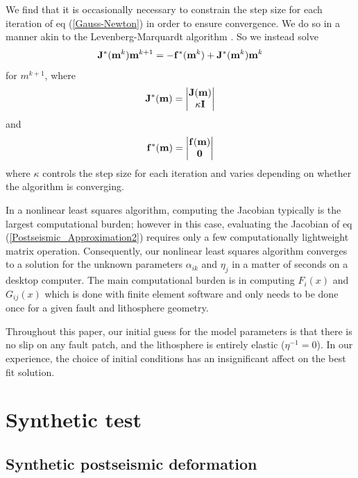 \documentclass[12pt]{article}
\begin{document}
We find that it is occasionally necessary to constrain the step size
for each iteration of eq (\ref{Gauss-Newton}) in order to ensure
convergence.  We do so in a manner akin to the Levenberg-Marquardt
algorithm \citep{A2013}.  So we instead solve
\begin{equation}\label{Levenberg-Marquardt}
  \bold{J^*}(\bold{m}^k)\bold{m}^{k+1} = -\bold{f^*}(\bold{m}^k) + \bold{J^*}(\bold{m}^k)\bold{m}^k
\end{equation}
for $m^{k+1}$, where
\begin{equation}
  \bold{J^*}(\bold{m}) = 
      \begin{vmatrix}
      \bold{J}(\bold{m})\\
      \kappa\bold{I}
      \end{vmatrix}
\end{equation}
and
\begin{equation}
  \bold{f^*}(\bold{m}) = 
      \begin{vmatrix}
      \bold{f}(\bold{m})\\
      \bold{0}
      \end{vmatrix}
\end{equation}
where $\kappa$ controls the step size for each iteration and varies
depending on whether the algorithm is converging.  

In a nonlinear least squares algorithm, computing the Jacobian
typically is the largest computational burden; however in this case,
evaluating the Jacobian of eq (\ref{Postseismic_Approximation2})
requires only a few computationally lightweight matrix operation.
Consequently, our nonlinear least squares algorithm converges to a
solution for the unknown parameters $\alpha_{ik}$ and $\eta_j$ in a
matter of seconds on a desktop computer.  The main computational
burden is in computing $F_i(x)$ and $G_{ij}(x)$ which is done with
finite element software and only needs to be done once for a given
fault and lithosphere geometry.

Throughout this paper, our initial guess for the model parameters is
that there is no slip on any fault patch, and the lithosphere is
entirely elastic ($\eta^{-1} = 0$).  In our experience, the choice of
initial conditions has an insignificant affect on the best fit
solution.

\section{Synthetic test}
\subsection{Synthetic postseismic deformation}
\end{document}
